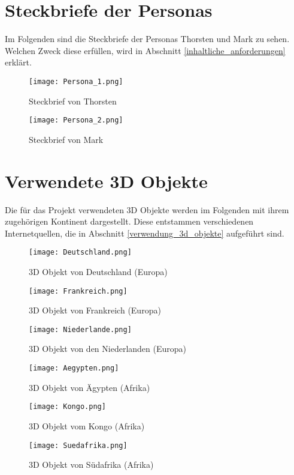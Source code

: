 \section{Steckbriefe der Personas}\label{persona}
Im Folgenden sind die Steckbriefe der Personas Thorsten und Mark zu sehen. Welchen Zweck diese erfüllen, wird in Abschnitt \ref{inhaltliche_anforderungen} erklärt.

\begin{figure}[!htb]
  \texttt{[image: Persona\_1.png]}
  \caption{Steckbrief von Thorsten}\label{fig:persona_thorsten}
\endminipage\hfill
{}
  \texttt{[image: Persona\_2.png]}
  \caption{Steckbrief von Mark}\label{fig:persona_mark}
\endminipage\hfill
\end{figure}

\section{Verwendete 3D Objekte}
Die für das Projekt verwendeten 3D Objekte werden im Folgenden mit ihrem zugehörigen Kontinent dargestellt. Diese entstammen verschiedenen Internetquellen, die in Abschnitt \ref{verwendung_3d_objekte} aufgeführt sind.

\begin{figure}[!htb]
  \texttt{[image: Deutschland.png]}
  \caption{3D Objekt von Deutschland (Europa)}\label{fig:deutschland}
\endminipage\hfill
{}
  \texttt{[image: Frankreich.png]}
  \caption{3D Objekt von Frankreich (Europa)}\label{fig:frankreich}
\endminipage\hfill
\end{figure}

\begin{figure}[!htb]
  \texttt{[image: Niederlande.png]}
  \caption{3D Objekt von den Niederlanden (Europa)}\label{fig:niederlande}
\endminipage\hfill
{}
  \texttt{[image: Aegypten.png]}
  \caption{3D Objekt von Ägypten (Afrika)}\label{fig:aegypten}
\endminipage\hfill
\end{figure}

\begin{figure}[!htb]
  \texttt{[image: Kongo.png]}
  \caption{3D Objekt vom Kongo (Afrika)}\label{fig:kongo}
\endminipage\hfill
{}
  \texttt{[image: Suedafrika.png]}
  \caption{3D Objekt von Südafrika (Afrika)}\label{fig:suedafrika}
\endminipage\hfill
\end{figure}

